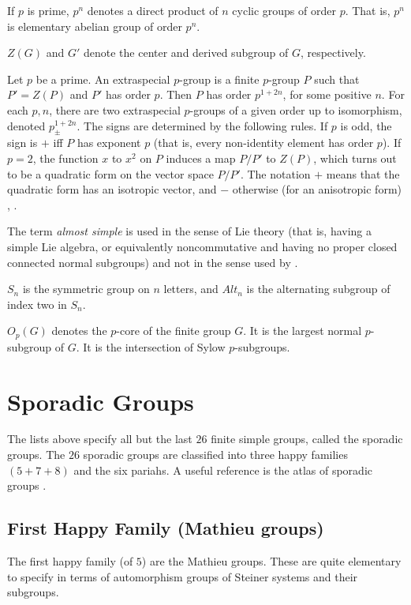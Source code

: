 If $p$ is prime, $p^n$ denotes a direct product of $n$ cyclic groups
of order $p$.  That is, $p^n$ is elementary abelian group of order
$p^n$.  \cite[p.9]{wilson2009finite}

$Z(G)$ and $G'$ denote the center and derived subgroup of $G$,
respectively.

Let $p$ be a prime.  An extraspecial $p$-group is a finite $p$-group
$P$ such that $P' = Z(P)$ and $P'$ has order $p$.  Then $P$ has order
$p^{1+2n}$, for some positive $n$.  For each $p,n$, there are two
extraspecial $p$-groups of a given order up to isomorphism, denoted
$p^{1+2n}_{\pm}$. The signs are determined by the following rules.  If
$p$ is odd, the sign is $+$ iff $P$ has exponent $p$ (that is, every
non-identity element has order $p$).  If $p=2$, the function $x$ to
$x^2$ on $P$ induces a map $P/P'$ to $Z(P)$, which turns out to be a
quadratic form on the vector space $P/P'$.  The notation $+$ means
that the quadratic form has an isotropic vector, and $-$ otherwise
(for an anisotropic form) \cite[p.19]{robert1998twelve},
\cite[pp.59,83]{wilson2009finite}.

The term {\it almost simple} is used in the sense of Lie theory (that
is, having a simple Lie algebra, or equivalently noncommutative and
having no proper closed connected normal subgroups) and not in the
sense used by \cite[p.22]{wilson2009finite}.

$S_n$ is the symmetric group on $n$ letters, and $Alt_n$ is the
alternating subgroup of index two in $S_n$.

$O_p(G)$ denotes the $p$-core of the finite group $G$.  It
is the largest normal $p$-subgroup of $G$.  It is the intersection
of Sylow $p$-subgroups.


\section{Sporadic Groups} 

The lists above specify all but the last $26$ finite simple groups,
called the sporadic groups.  The $26$ sporadic groups are classified
into three happy families $(5+7+8)$ and the six pariahs.  A useful
reference is the atlas of sporadic groups \cite{A}.

\subsection{First Happy Family (Mathieu groups)} \label{sec:first-happy-family}

The first happy family (of $5$) are the Mathieu groups.  These are quite
elementary to specify in terms of automorphism groups of Steiner
systems and their subgroups.

